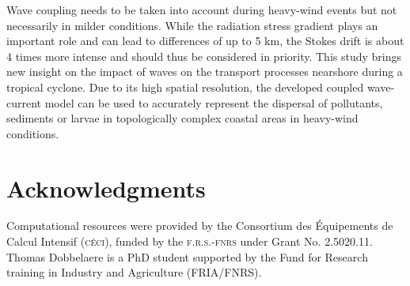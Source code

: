 \documentclass[preprint,12pt,authoryear]{elsarticle}
\begin{document}
Wave coupling needs to be taken into account during heavy-wind events but not necessarily in milder conditions. While the radiation stress gradient plays an important role and can lead to differences of up to 5 km, the Stokes drift is about 4 times more intense and should thus be considered in priority. This study brings new insight on the impact of waves on the transport processes nearshore during a tropical cyclone. Due to its high spatial resolution, the developed coupled wave-current model can be used to accurately represent the dispersal of pollutants, sediments or larvae in topologically complex coastal areas in heavy-wind conditions.  

\section*{Acknowledgments}
Computational resources were provided by the Consortium des \'Equipements de Calcul Intensif (\textsc{c\'eci}), funded by the \textsc{f.r.s.-fnrs} under Grant No. 2.5020.11. Thomas Dobbelaere is a PhD student supported by the Fund for Research training in Industry and Agriculture (\textsc{FRIA}/\textsc{FNRS}).

 

\end{document}
